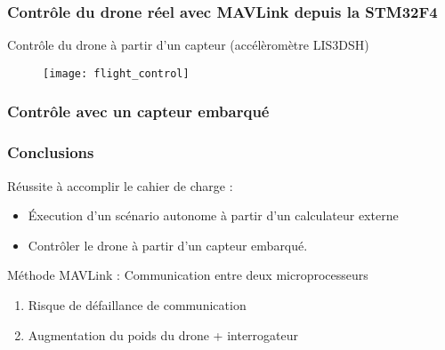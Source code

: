 \documentclass{beamer}
\begin{document}

\begin{frame}
\frametitle{Contr\^ole du drone r\'eel avec MAVLink depuis la STM32F4}

Contr\^ole du drone \`a partir d'un capteur (acc\'el\`erom\`etre LIS3DSH)

\begin{figure}
\texttt{[image: flight\_control]}
\end{figure}

\end{frame}



\begin{frame}

\frametitle{Contr\^ole avec un capteur embarqu\'e}



\end{frame}


\begin{frame}
\frametitle{Conclusions}

R\'eussite \`a accomplir le cahier de charge :

\begin{itemize}

\item \'Execution d'un sc\'enario autonome \`a partir d'un calculateur externe
\item Contr\^oler le drone \`a partir d'un capteur embarqu\'e.

\end{itemize}

M\'ethode MAVLink : Communication entre deux microprocesseurs

\begin{enumerate}

\item Risque de d\'efaillance de communication 
\item Augmentation du poids du drone + interrogateur

\end{enumerate} 


\end{frame}
\end{document}
